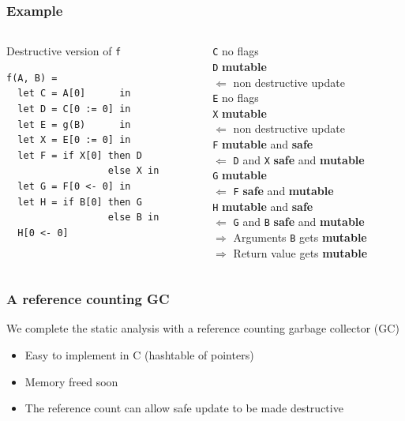 \documentclass{beamer}
\newcommand{\cl}[1]{\texttt{#1}}
\newcommand{\bang}{\textbf{mutable }}
\newcommand{\safe}{\textbf{safe }}
\begin{document}
\begin{frame}[fragile]
\frametitle{Example}
\begin{columns}
\begin{column}{0.5\textwidth}
Destructive version of \cl{f}
\begin{lstlisting}
f(A, B) =
  let C = A[0]      in
  let D = C[0 := 0] in
  let E = g(B)      in
  let X = E[0 := 0] in
  let F = if X[0] then D
                  else X in
  let G = F[0 <- 0] in
  let H = if B[0] then G
                  else B in
  H[0 <- 0]
\end{lstlisting}
\end{column}
\begin{column}{0.5\textwidth}
\pause
\cl{C} no flags \\
\pause
\cl{D} \bang \\
$\Longleftarrow$ non destructive update\\
\pause
\cl{E} no flags \\
\pause
\cl{X} \bang \\
$\Longleftarrow$ non destructive update\\
\pause
\cl{F} \bang and \safe \\
$\Longleftarrow$ \cl{D} and \cl{X} \safe and \bang \\
\pause
\cl{G} \bang \\
$\Longleftarrow$ \cl{F} \safe and \bang \\
\pause
\cl{H} \bang and \safe \\
$\Longleftarrow$ \cl{G} and \cl{B} \safe and \bang \\
\pause
$\Longrightarrow$ Arguments \cl{B} gets \bang \\
$\Longrightarrow$ Return value gets \bang \\
\end{column}
\end{columns}
\end{frame}

\begin{frame}
\frametitle{A reference counting GC}
We complete the static analysis with a reference counting garbage collector (GC)
\begin{itemize}
\itemsep1em
\item Easy to implement in C (hashtable of pointers)
\item Memory freed soon
\item The reference count can allow safe update to be made destructive
\end{itemize}
\end{frame}
\end{document}
